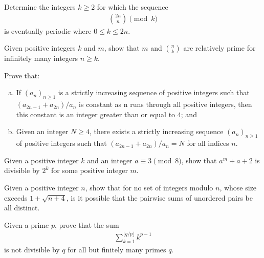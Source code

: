\documentclass[problems.tex]{subfile}
\begin{document}
	\begin{problem}
		Determine the integers $k \geq 2$ for which the sequence
			\begin{align*}
				\binom{2n}{n} \pmod k
			\end{align*}
		is eventually periodic where $0\leq k\leq 2n$.
	\end{problem}

	\begin{problem}
		Given positive integers $k$ and $m$, show that $m$ and $\binom{n}{k}$ are relatively prime for infinitely many integers $n \geq k$.
	\end{problem}

	\begin{problem}
		Prove that:
		\begin{enumerate}[(a)]
			\item If $(a_n)_{n\geq 1}$ is a strictly increasing sequence of positive integers such that $(a_{2n-1}+a_{2n})/a_n$ is constant as n runs through all positive integers, then this constant is an integer greater than or equal to $4$; and
			\item Given an integer $N \geq 4$, there exists a strictly increasing sequence $(a_n)_{n\geq 1}$ of positive integers such that $(a_{2n-1}+a_{2n})/a_n=N$ for all indices $n$.
		\end{enumerate}
	\end{problem}

	\begin{problem}
		Given a positive integer $k$ and an integer $a \equiv 3 \pmod 8$, show that $a^m + a + 2$ is divisible by $2^k$ for some positive integer $m$.
	\end{problem}

	\begin{problem}
		Given a positive integer $n$, show that for no set of integers modulo $n$, whose size exceeds $1 + \sqrt{n + 4}$, is it possible that the pairwise sums of unordered pairs be all distinct.
	\end{problem}

	\begin{problem}
		Given a prime $p$, prove that the sum
			\begin{align*}
				\sum\limits_{k=1}^{\lfloor q/p \rfloor}{k^{p-1}}
			\end{align*}
		is not divisible by $q$ for all but finitely many primes $q$. %
	\end{problem}
\end{document}
